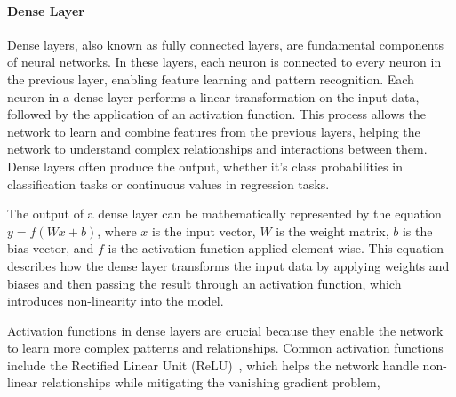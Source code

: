 \paragraph{Dense Layer}
Dense layers, also known as fully connected layers, are fundamental components of neural networks. In these layers, each neuron is connected to every neuron in the previous layer, enabling feature learning and pattern recognition. Each neuron in a dense layer performs a linear transformation on the input data, followed by the application of an activation function. This process allows the network to learn and combine features from the previous layers, helping the network to understand complex relationships and interactions between them. Dense layers often produce the output, whether it’s class probabilities in classification tasks or continuous values in regression tasks.

The output of a dense layer can be mathematically represented by the equation $y=f(Wx+b)$, where $x$ is the input vector, $W$ is the weight matrix, $b$ is the bias vector, and $f$ is the activation function applied element-wise. This equation describes how the dense layer transforms the input data by applying weights and biases and then passing the result through an activation function, which introduces non-linearity into the model.

Activation functions in dense layers are crucial because they enable the network to learn more complex patterns and relationships. Common activation functions include the Rectified Linear Unit (ReLU)~\cite{relu}, which helps the network handle non-linear relationships while mitigating the vanishing gradient problem,


